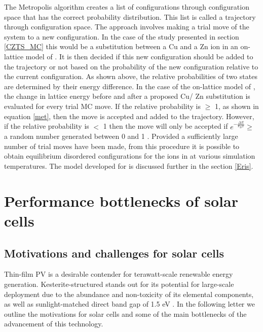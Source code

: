 \documentclass[11pt, twoside]{report}
\begin{document}
The Metropolis algorithm creates a list of configurations through configuration space that has the correct probability distribution. This list is called a trajectory through configuration space. The approach involves making a trial move of the system to a new configuration. In the case of the study presented in section \ref{CZTS_MC} this would be a substitution between a Cu and a Zn ion in an on-lattice model of {\CZTS}. It is then decided if this new configuration should be added to the trajectory or not based on the probability of the new configuration relative to the current configuration. As shown above, the relative probabilities of two states are determined by their energy difference. In the case of the on-lattice model of {\CZTS}, the change in lattice energy before and after a proposed Cu/ Zn substitution is evaluated for every trial MC move. If the relative probability is  $\geq$ 1, as shown in equation \ref{met}, then the move is accepted and added to the trajectory. However, if the relative probability is $<$ 1 then the move will only be accepted if $e^{-\frac{\Delta E}{k_BT}} \ge$ a random number generated between 0 and 1 \cite{Lesar3}. Provided a sufficiently large number of trial moves have been made, from this procedure it is possible to obtain equilibrium disordered configurations for the ions in {\CZTS} at various simulation temperatures. The model developed for {\CZTS} is discussed further in the section \ref{Eris}.


 








\chapter{Performance bottlenecks of {\CZTS} solar cells}\label{chap:CZTS}
\section{Motivations and challenges for {\CZTS} solar cells}
Thin-film PV is a desirable contender for terawatt-scale renewable energy generation. Kesterite-structured {\CZTS} stands out for its potential for large-scale deployment due to the abundance and non-toxicity of its elemental components, as well as sunlight-matched direct band gap of 1.5 eV \cite{CZTS_rev}. In the following letter we outline the motivations for {\CZTS} solar cells and some of the main bottlenecks of the advancement of this technology.
\end{document}
